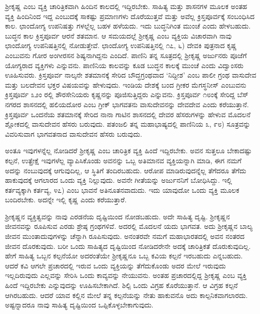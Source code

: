 ಶ್ರೀಕೃಷ್ಣ ಎಂಬ ವ್ಯಕ್ತಿ ಚಾರಿತ್ರಿಕವಾಗಿ ಹಿಂದಿನ ಕಾಲದಲ್ಲಿ ಇದ್ದಿರಬೇಕು. ಸಾಹಿತ್ಯ ಮತ್ತು ಶಾಸನಗಳ ಮೂಲಕ ಅಂತಹ ವ್ಯಕ್ತಿ ಹಿಂದಿನಿಂದ ಇದ್ದ ಎಂಬುದಕ್ಕೆ ಸಾಕಷ್ಟು ಪ್ರಮಾಣಗಳು ದೊರೆಯುತ್ತವೆ ಮತ್ತು ಅವೆಲ್ಲ ಕ್ರಿಸ್ತಪೂರ್ವಕ್ಕೆ ಸಂಬಂಧಿಸಿದ ಕಾಲ. ಛಾಂದೋಗ್ಯ ಉಪನಿಷತ್ತು ಗಳಲ್ಲೆಲ್ಲ ಬಹಳ ಹಳೆಯದು. ಇದು ಬುದ್ಧನಿಗಿಂತ ಮುಂಚೆ ಎಂದು ಹೇಳಬಹುದು. ಬುದ್ಧನ ಕಾಲ ಕ್ರಿಸ್ತಪೂರ್ವ ಆರನೆ ಶತಮಾನ. ಆ ಸಮಯದಲ್ಲೆ ಶ್ರೀಕೃಷ್ಣ ಎಂಬ ವ್ಯಕ್ತಿಯ ವಿಚಾರವಾಗಿ ನಾವು ಛಾಂದೋಗ್ಯ ಉಪನಿಷತ್ತಿನಲ್ಲಿ ನೋಡುತ್ತೇವೆ. ಛಾಂದೋಗ್ಯ ಉಪನಿಷತ್ತಿನಲ್ಲಿ  ೧೭, ೬) ದೇವಕಿ ಪುತ್ರನಾದ ಕೃಷ್ಣ ಎಂಬುವನು ಗೋರ ಅಂಗೀರಸನ ಶಿಷ್ಯನಾಗಿದ್ದನು ಎಂದಿದೆ. ಪಾಣಿನಿ ತನ್ನ ಸೂತ್ರದಲ್ಲಿ ಶ್ರೀಕೃಷ್ಣ ಅರ್ಜುನರು ಪೂಜೆಗೆ ಯೋಗ್ಯರಾದ ವ್ಯಕ್ತಿಗಳು ಎನ್ನುವನು. ಪಾಣಿನಿಯ ಕಾಲವನ್ನು ಕೂಡ ಬುದ್ಧನ ಕಾಲಕ್ಕೆ ಮುಂಚೆ ಎಂದು ವಿದ್ವಾಂಸರು ಊಹಿಸುವರು. ಕ್ರಿಸ್ತಪೂರ್ವ ನಾಲ್ಕನೇ ಶತಮಾನಕ್ಕೆ ಸೇರಿದ ಬೌದ್ಧಗ್ರಂಥವಾದ ‘ನಿದ್ದೀಶ’ ಎಂಬ ಪಾಲೀ ಗ್ರಂಥ ವಾಸುದೇವ ಮತ್ತು ಬಲದೇವನ ಭಕ್ತರ ವಿಷಯವನ್ನು ಹೇಳುವುದು. ಇಂಡಿಯ ದೇಶಕ್ಕೆ ಬಂದ ಗ್ರೀಕರ ಮೆಗಸ್ಥನೀಸ್ ಎಂಬುವನು ಕ್ರಿಸ್ತಪೂರ್ವ ೩೨ಂ ರಲ್ಲಿ ಶೌರಸೇನಿಯರು ಕೃಷ್ಣನನ್ನು ಪೂಜಿಸುತ್ತಿದ್ದರು ಎನ್ನುವನು. ಕ್ರಿಸ್ತಪೂರ್ವ ೧೮ಂಕ್ಕೆ ಸೇರಿದ್ದ ಬೆಸ್ ನಗರದ ಶಾಸನದಲ್ಲಿ ಹಲಿಯದೋರ ಎಂಬ ಗ್ರೀಕ್ ಭಾಗವತನು ವಾಸುದೇವನನ್ನು ದೇವದೇವ ಎಂದು ಕರೆಯುತ್ತಾನೆ. ಕ್ರಿಸ್ತಪೂರ್ವ ಒಂದನೆಯ ಶತಮಾನಕ್ಕೆ ಸೇರಿದ ನಾನಾ ಗಾಟಿನ ಶಾಸನದಲ್ಲಿ ದೇವರ ಹೆಸರುಗಳನ್ನು ಹೇಳುವ ಮೊದಲನೆ ಶ್ಲೋಕದಲ್ಲಿ ವಾಸುದೇವನ ಹೆಸರು ಬರುವುದು. ಪತಂಜಲಿ ತನ್ನ ಮಹಾಭಾಷ್ಯದಲ್ಲಿ ಪಾಣಿನಿಯ  ೩, ೯೮) ಸೂತ್ರವನ್ನು ವಿವರಿಸುವಾಗ ಭಾಗವತನಾದ ವಾಸುದೇವನ ಹೆಸರು ಬರುವುದು.

ಅಂತೂ ಇವುಗಳನ್ನೆಲ್ಲ ನೋಡಿದರೆ ಶ್ರೀಕೃಷ್ಣ ಎಂಬ ಚಾರಿತ್ರಿಕ ವ್ಯಕ್ತಿ ಹಿಂದೆ ಇದ್ದಿರಬೇಕು. ಅವನ ಸುತ್ತಲೂ ಬೇಕಾದಷ್ಟು ಕಲ್ಪನೆ, ಉತ್ಪ್ರೇಕ್ಷೆ ಇವುಗಳೆಲ್ಲ ವ್ಯಾಪಿಸಿಕೊಂಡು ಅವನನ್ನು ಒಬ್ಬ ಅತಿಮಾನವ ವ್ಯಕ್ತಿಯನ್ನಾಗಿ ಮಾಡಿ, ಈಗ ನಮಗೆ ಅದನ್ನು ನಂಬುವುದಕ್ಕೆ ಆಗುವುದಿಲ್ಲ, ಆ ಸ್ಥಿತಿಗೆ ತಂದಿರಬಹುದು. ಆರೋಪ ಮಾಡಿರುವುದನ್ನೆಲ್ಲ ತೆಗೆದರೂ ತೆಗೆದು ಹಾಕುವುದಕ್ಕೆ ಆಗಲಾರದ ಒಂದು ವ್ಯಕ್ತಿ ನಿಲ್ಲುವುದು. ಅವನೇ ಗೀತೆಯನ್ನು ಅರ್ಜುನನಿಗೆ ಬೋಧಿಸಿದ್ದು. ಇಲ್ಲಿ ಕರ್ತವ್ಯಕ್ಕಾಗಿ ಕರ್ತವ್ಯ, ೪೭) ಎಂಬ ಭಾವನೆ ಅತಿನೂತನವಾದುದು. ಇದು ಯಾವುದೋ ಒಂದು ವ್ಯಕ್ತಿ ಮೂಲಕ ಬಂದಿರಬೇಕು. ಅದನ್ನೇ ಇಲ್ಲಿ ಕೃಷ್ಣ ಎಂದು ಕರೆಯುತ್ತಾರೆ.

ಶ್ರೀಕೃಷ್ಣನ ವ್ಯಕ್ತಿತ್ವವನ್ನು ನಾವು ಎರಡನೆಯ ದೃಷ್ಟಿಯಿಂದ ನೋಡಬಹುದು. ಅದೇ ಸಾಹಿತ್ಯ ದೃಷ್ಟಿ. ಶ್ರೀಕೃಷ್ಣನ ಜೀವನವನ್ನು ರೂಪಿಸುವ ಎರಡು ಶ್ರೇಷ್ಠ ಗ್ರಂಥಗಳಿವೆ. ಅದರಲ್ಲಿ ಮೊದಲನೆ ಯದು ಭಾಗವತ. ಅದು ಶ್ರೀಕೃಷ್ಣನ ಬಾಲ್ಯ ಜೀವನ ಮುಂತಾದುವುಗಳನ್ನು ಚೆನ್ನಾಗಿ ರೂಪಿಸುವುದು. ಅನಂತರವೇ ನಮಗೆ ಮಹಾಭಾರತದಲ್ಲಿ ಅವನ ನಂತರದ ಜೀವನ ದೊರಕುವುದು. ಬರೀ ಒಂದು ಸಾಹಿತ್ಯದ ದೃಷ್ಟಿಯಿಂದ ನೋಡಿದರೇನೇ ಅದಕ್ಕೆ ಚಾರಿತ್ರಿಕತೆ ದೊರುಕುವುದಿಲ್ಲ. ಹೇಗೆ ಸಾಹಿತ್ಯ ಒಬ್ಬನ ಕಲ್ಪನೆಯೋ ಅದರಂತೆಯೇ ಶ್ರೀಕೃಷ್ಣನೂ ಒಬ್ಬ ಕವಿಯ ಕಲ್ಪನೆ ಇರಬಹುದು ಎನ್ನಬಹುದು. ಆದರೆ ಕವಿ ಆಗಲೇ ಪ್ರಚಾರದಲ್ಲಿ ಇರುವ ಒಂದು ವ್ಯಕ್ತಿಯನ್ನು ತೆಗೆದುಕೊಂಡು ಅದರ ಮೇಲೆ ಇರುವುದು ಇಲ್ಲದಿರುವುದು ಎಲ್ಲವನ್ನು ಸೇರಿಸಿ ಒಂದು ಕಾವ್ಯವನ್ನು ನೇಯುವನು. ಅಂತಹ ಪ್ರಚಾರದಲ್ಲಿದ್ದ ಶ್ರೀಕೃಷ್ಣ ಎಂಬ ವ್ಯಕ್ತಿ ಹಿಂದೆ ಇದ್ದಿರಬೇಕು ಎನ್ನುವುದನ್ನು ಊಹಿಸಬೇಕಾಗಿದೆ. ಶಿಲ್ಪಿ ಒಂದು ವಿಗ್ರಹ ಕೊರೆಯುತ್ತಾನೆ. ಆ ವಿಗ್ರಹ ಕಲ್ಪನೆ ಆಗಿರಬಹುದು. ಆದರೆ ಯಾವ ಕಲ್ಲಿನ ಮೇಲೆ ತನ್ನ ಕಲ್ಪನೆಯನ್ನು ನೇತು ಹಾಕುವನೊ ಅದು ಕಾಲ್ಪನಿಕವಾಗಲಾರದು. ಅಷ್ಟನ್ನಾದರೂ ನಾವು ಸಾಹಿತ್ಯ ದೃಷ್ಟಿಯಿಂದ ಒಪ್ಪಿಕೊಳ್ಳಬೇಕಾಗುವುದು.

